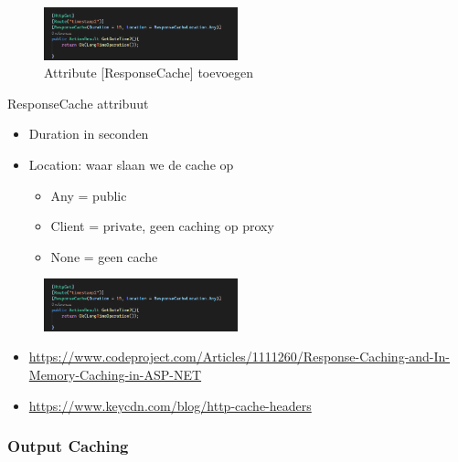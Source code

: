 \documentclass{article}
\begin{document}
\begin{figure}[H]
    \centering
    \includegraphics[width=0.5\textwidth]{caching-response-werking3.png}
    \caption{Attribute [ResponseCache] toevoegen}
\end{figure}

ResponseCache attribuut

\begin{itemize}
    \item Duration in seconden
    \item Location: waar slaan we de cache op
    \begin{itemize}
        \item Any = public
        \item Client = private, geen caching op proxy
        \item None = geen cache
    \end{itemize}
\end{itemize}

\begin{figure}[H]
    \centering
    \includegraphics[width=0.5\textwidth]{caching-response-attribute.png}
    \caption{}
\end{figure}


\begin{itemize}
    \item \url{https://www.codeproject.com/Articles/1111260/Response-Caching-and-In-Memory-Caching-in-ASP-NET}
    \item \url{https://www.keycdn.com/blog/http-cache-headers}
\end{itemize}

\subsubsection{Output Caching}
\end{document}
